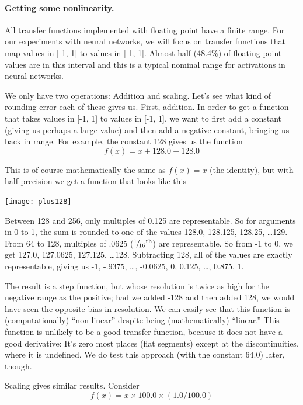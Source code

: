 \documentclass[twocolumn]{article}
\newcommand\sfrac[2]{\!{}\,^{#1}\!/{}\!_{#2}}
\begin{document}
\paragraph{Getting some nonlinearity.} \label{sec:plus128}
All transfer functions implemented with floating point have a finite
range. For our experiments with neural networks, we will focus on
transfer functions that map values in [-1, 1] to values in [-1, 1].
Almost half (48.4\%) of floating point values are in this interval and this
is a typical nominal range for activations in neural networks.

We only have two operations: Addition and scaling. Let's see what kind
of rounding error each of these gives us. First, addition. In order to
get a function that takes values in [-1, 1] to values in [-1, 1], we
want to first add a constant (giving us perhaps a large value) and
then add a negative constant, bringing us back in range. For example,
the constant 128 gives us the function
%
$$f(x) = x + 128.0 - 128.0$$

This is of course mathematically the same as $f(x) = x$ (the
identity), but with half precision we get a function that looks like
this

\begin{center}
\texttt{[image: plus128]}
\end{center}


Between 128 and 256, only multiples of 0.125 are representable. So for
arguments in 0 to 1, the sum is rounded to one of the values 128.0,
128.125, 128.25, \ldots 129. From 64 to 128, multiples of .0625
($\sfrac{1}{16}\th$) are representable. So from -1 to 0, we get 127.0, 127.0625,
127.125, \ldots 128. Subtracting 128, all of the values are exactly
representable, giving us -1, -.9375, \ldots, -0.0625, 0, 0.125,
\ldots, 0.875, 1.

The result is a step function, but whose resolution is twice as high
for the negative range as the positive; had we added -128 and then
added 128, we would have seen the opposite bias in resolution. We can
easily see that this function is (computationally) ``non-linear''
despite being (mathematically) ``linear.'' This function is unlikely
to be a good transfer function, because it does not have a good
derivative: It's zero most places (flat segments) except at the
discontinuities, where it is undefined. We do test this approach
(with the constant 64.0) later, though.

Scaling gives similar results. Consider
%
$$f(x) = x \times 100.0 \times (1.0 / 100.0)$$
\end{document}
